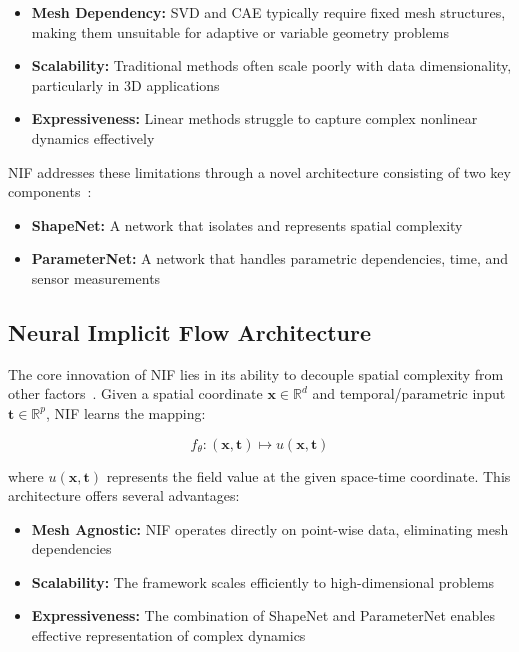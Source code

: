 \documentclass[10pt,journal,compsoc,onecolumn]{IEEEtran}
\begin{document}
\begin{itemize}
    \item \textbf{Mesh Dependency:} SVD and CAE typically require fixed mesh structures, making them unsuitable for adaptive or variable geometry problems
    \item \textbf{Scalability:} Traditional methods often scale poorly with data dimensionality, particularly in 3D applications
    \item \textbf{Expressiveness:} Linear methods struggle to capture complex nonlinear dynamics effectively
\end{itemize}

NIF addresses these limitations through a novel architecture consisting of two key components~\cite{nif2023}:

\begin{itemize}
    \item \textbf{ShapeNet:} A network that isolates and represents spatial complexity
    \item \textbf{ParameterNet:} A network that handles parametric dependencies, time, and sensor measurements
\end{itemize}

\subsection{Neural Implicit Flow Architecture}
The core innovation of NIF lies in its ability to decouple spatial complexity from other factors~\cite{nif2023}. Given a spatial coordinate $\mathbf{x} \in \mathbb{R}^d$ and temporal/parametric input $\mathbf{t} \in \mathbb{R}^p$, NIF learns the mapping:

\begin{equation}
    f_\theta: (\mathbf{x}, \mathbf{t}) \mapsto u(\mathbf{x}, \mathbf{t})
\end{equation}

where $u(\mathbf{x}, \mathbf{t})$ represents the field value at the given space-time coordinate. This architecture offers several advantages:

\begin{itemize}
    \item \textbf{Mesh Agnostic:} NIF operates directly on point-wise data, eliminating mesh dependencies
    \item \textbf{Scalability:} The framework scales efficiently to high-dimensional problems
    \item \textbf{Expressiveness:} The combination of ShapeNet and ParameterNet enables effective representation of complex dynamics
\end{itemize}
\end{document}
